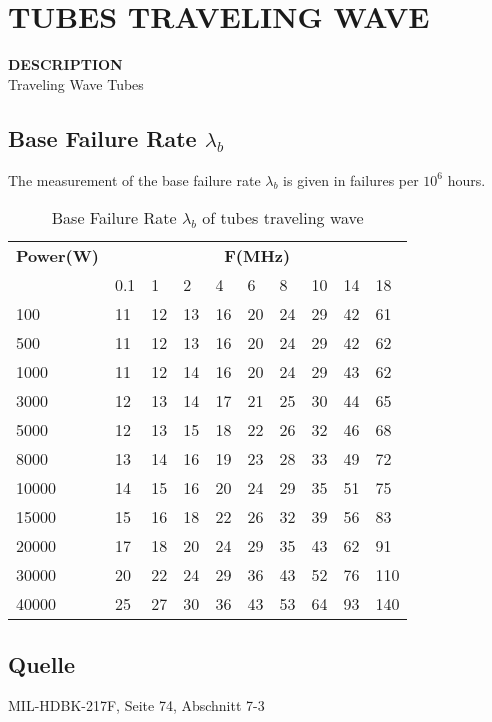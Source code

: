 \section{TUBES TRAVELING WAVE}
\begin{minipage}[t]{0.7\textwidth}
    \textbf{DESCRIPTION}\\
    {\fontsize{12pt}{12pt}\selectfont Traveling Wave Tubes}
\end{minipage}

\subsection{Base Failure Rate $\lambda_b$}
The measurement of the base failure rate $\lambda_b$ is given in failures per $10^6$ hours.
\begin{table}[ht]
{\centering

\begin{tabular}{|p{2cm}|*{9}{p{.75cm}|}}
    \hline
    \textbf{Power(W)} & \multicolumn{9}{c|}{\textbf{F(MHz)}} \\
     & 0.1 & 1 & 2 & 4 & 6 & 8 & 10 & 14 & 18 \\
    \hline
    100 & 11 & 12 & 13 & 16 & 20 & 24 & 29 & 42 & 61 \\
    \hline
    500 & 11 & 12 & 13 & 16 & 20 & 24 & 29 & 42 & 62 \\
    \hline
    1000 & 11 & 12 & 14 & 16 & 20 & 24 & 29 & 43 & 62 \\
    \hline
    3000 & 12 & 13 & 14 & 17 & 21 & 25 & 30 & 44 & 65 \\
    \hline
    5000 & 12 & 13 & 15 & 18 & 22 & 26 & 32 & 46 & 68 \\
    \hline
    8000 & 13 & 14 & 16 & 19 & 23 & 28 & 33 & 49 & 72 \\
    \hline
    10000 & 14 & 15 & 16 & 20 & 24 & 29 & 35 & 51 & 75 \\
    \hline
    15000 & 15 & 16 & 18 & 22 & 26 & 32 & 39 & 56 & 83 \\
    \hline
    20000 & 17 & 18 & 20 & 24 & 29 & 35 & 43 & 62 & 91 \\
    \hline
    30000 & 20 & 22 & 24 & 29 & 36 & 43 & 52 & 76 & 110 \\
    \hline
    40000 & 25 & 27 & 30 & 36 & 43 & 53 & 64 & 93 & 140 \\
    \hline
\end{tabular}
\caption{Base Failure Rate $\lambda_b$ of tubes traveling wave}
\label{tab:bfr_tubes_traveling_wave}
\par}
\subsection*{Quelle}
MIL-HDBK-217F, Seite 74, Abschnitt 7-3
\end{table}